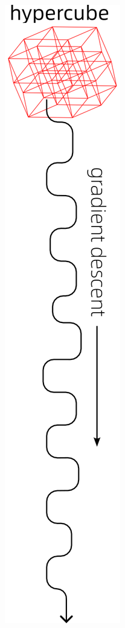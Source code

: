 \documentclass[16pt]{beamer}
\begin{document}
\begin{frame}
\begin{columns}
		\begin{column}{0.2\textwidth}  %
			\includegraphics[scale=0.45]{gradient-descent-from-hypercube.png}
		\end{column}
	\end{columns}
\end{frame}
\end{document}
